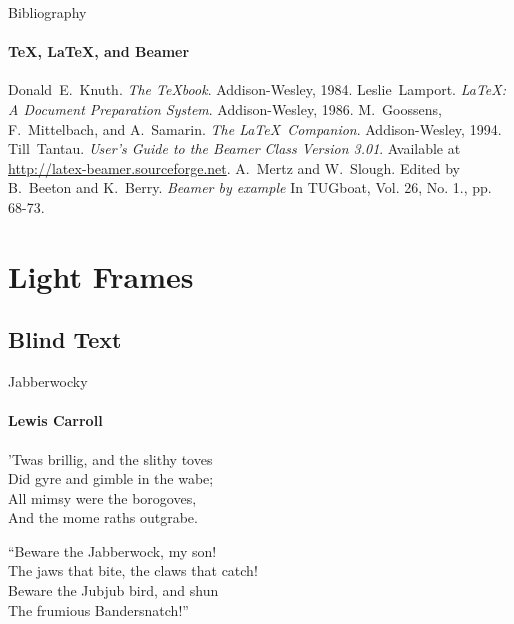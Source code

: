 \documentclass{beamer}
\begin{document}
\begin{darkframes}
        \begin{frame}[label=bibliography]{Bibliography}
          \framesubtitle{\TeX, \LaTeX, and Beamer}
          \begin{thebibliography}{9}
                Donald~E.~Knuth.
                \emph{The \TeX book}.
                Addison-Wesley, 1984.
                Leslie~Lamport.
                \emph{\LaTeX : A Document Preparation System}.
                Addison-Wesley, 1986.
                M.~Goossens, F.~Mittelbach, and A.~Samarin.
                \emph{The \LaTeX\ Companion}.
                Addison-Wesley, 1994.
                Till~Tantau.
                \emph{User's Guide to the Beamer Class Version 3.01}.
                Available at \url{http://latex-beamer.sourceforge.net}.
                A.~Mertz and W.~Slough.
                Edited by B.~Beeton and K.~Berry.
                \emph{Beamer by example} In TUGboat,
                  Vol. 26, No. 1., pp. 68-73.
          \end{thebibliography}
        \end{frame}
    
      \end{darkframes}
    
      \section{Light Frames}
        \subsection{Blind Text}
        \begin{frame}{Jabberwocky}
          \framesubtitle{Lewis Carroll}%
          'Twas brillig, and the slithy toves\\
          Did gyre and gimble in the wabe;\\
          All mimsy were the borogoves,\\
          And the mome raths outgrabe.\\\bigskip
    
          “Beware the Jabberwock, my son!\\
          The jaws that bite, the claws that catch!\\
          Beware the Jubjub bird, and shun\\
          The frumious Bandersnatch!”\\
        \end{frame}
\end{document}
